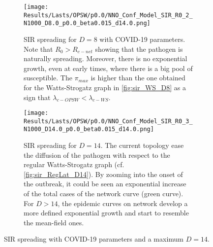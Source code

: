 \documentclass[a4paper,10pt, oneside]{book} %
\theoremstyle{definition}
\begin{document}
\begin{figure}[htbp]
	\centering
    \begin{subfigure}[t]{0.95\linewidth}
        \texttt{[image: Results/Lasts/OPSW/p0.0/NNO\_Conf\_Model\_SIR\_R0\_2\_N1000\_D8.0\_p0.0\_beta0.015\_d14.0.png]}
		\centering
        \caption{SIR spreading for $D = 8$ with COVID-19 parameters. Note that $R_0 > R_{c-net}$ showing that the pathogen is naturally spreading. Moreover, there is no exponential growth, even at early times, where there is a big pool of susceptible. The $\pi_{max} $ is higher than the one obtained for the Watts-Strogatz graph in \autoref{fig:sir_WS_D8} as a sign that $\lambda_{c-OPSW} < \lambda_{c-WS}$.}
        \label{fig:sir_O-PSW_D8}
    \end{subfigure}
	\vfill
	\begin{subfigure}[b]{0.95\linewidth}
		\centering
        \texttt{[image: Results/Lasts/OPSW/p0.0/NNO\_Conf\_Model\_SIR\_R0\_3\_N1000\_D14.0\_p0.0\_beta0.015\_d14.0.png]}
        \caption{SIR spreading for $D = 14$. The current topology ease the diffusion of the pathogen with respect to the regular Watts-Strogatz graph (cf. \autoref{fig:sir_RegLat_D14}). By zooming into the onset of the outbreak, it could be seen an exponential increase of the total cases of the network curve (green curve). For $D > 14$, the epidemic curves on network develop a more defined exponential growth and start to resemble the mean-field ones.}
        \label{fig:sir_O-PSW_D14_p0}
    \end{subfigure}
	\caption{SIR spreading with COVID-19 parameters and a maximum $D = 14$.}
	\label{fig:sir_O-PSW_COVID}
\end{figure}
\end{document}
